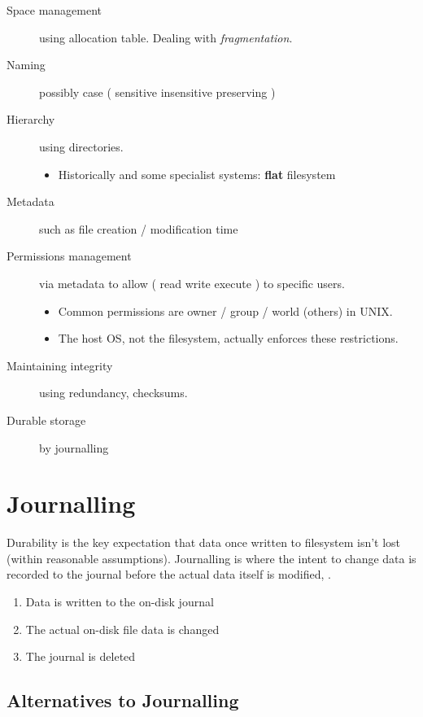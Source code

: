 \begin{description}
\item[Space management]
  using allocation table. Dealing with \emph{fragmentation}.
\item[Naming]
  possibly case ( sensitive \textbar{} insensitive \textbar{} preserving )
\item[Hierarchy]
  using directories.
  \begin{itemize}
    
  \item
    Historically and some specialist systems: \textbf{flat} filesystem
  \end{itemize}
\item[Metadata]
  such as file creation / modification time
\item[Permissions management]
  via metadata to allow ( read \textbar{} write \textbar{} execute ) to
  specific users.
  
  \begin{itemize}
  \item
    Common permissions are owner / group / world (others) in UNIX.
  \item
    The host OS, not the filesystem, actually enforces these restrictions.
  \end{itemize}
\item[Maintaining integrity]
  using redundancy, checksums.
\item[Durable storage]
  by journalling
\end{description}

\section{Journalling}
\label{sec:journalling}

Durability is the key expectation that data once written to filesystem
isn't lost (within reasonable assumptions). Journalling is where the
intent to change data is recorded to the journal before the actual data
itself is modified, .

\begin{enumerate}
\item
  Data is written to the on-disk journal
\item
  The actual on-disk file data is changed
\item
  The journal is deleted
\end{enumerate}

\subsection{Alternatives to Journalling}
\label{sec:alternatives-to-journalling}

